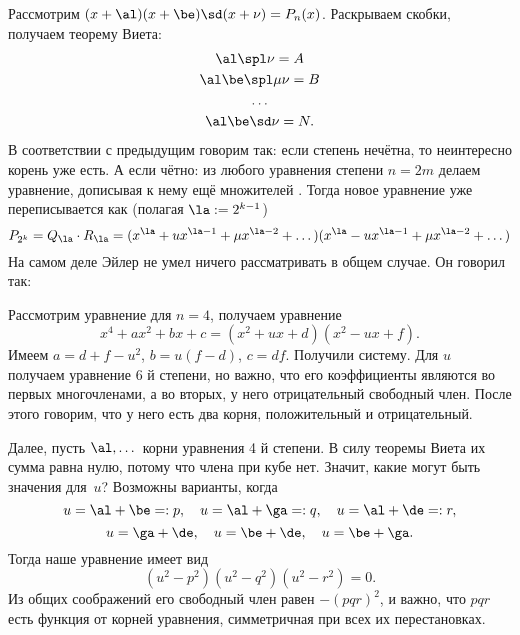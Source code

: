 \documentclass[a4paper,oneside,fleqn,10pt]{article}
\begin{document}
Рассмотрим $(x + \al)(x + \be)\sd(x+\nu) = P_n(x)$.
Раскрываем скобки, получаем теорему Виета:
\begin{gather*}
\al \spl \nu = A\\
\al\be \spl \mu\nu = B\\
\ldots\\
\al\be\sd\nu  = N.
\end{gather*}
В соответствии с предыдущим говорим так:
если степень нечётна, то неинтересно корень уже есть.
А если чётно: из любого уравнения степени $n = 2m$ делаем уравнение, дописывая
к нему ещё множителей . Тогда новое уравнение уже переписывается
как (полагая $\la := 2^{k-1}$)
$$
  P_{2^k} = Q_\la \cdot R_\la=
  (x^\la + u x^{\la-1} + \mu x^{\la-2} + \dots)(x^\la - u x^{\la-1} + \mu x^{\la-2}+\dots )
$$
На самом деле Эйлер не умел ничего рассматривать в общем случае. Он говорил так:

Рассмотрим уравнение для $n=4$, получаем уравнение
$$
  x^4 + ax^2 + bx + c = (x^2 + ux + d) (x^2 - ux + f).
$$
Имеем $a = d + f - u^2$, $b = u(f-d)$, $c = df$.
Получили систему. Для $u$ получаем уравнение 6 й степени, но важно, что его коэффициенты
являются во первых многочленами, а во вторых, у него отрицательный свободный член.
После этого говорим, что у него есть два корня, положительный и отрицательный.

\medskip
\vbox{\offinterlineskip
{}
\vskip3pt
\vskip3pt
}
\medskip

Далее, пусть $\al, \dots$ корни уравнения 4 й степени. В силу теоремы Виета их сумма равна нулю,
потому что члена при кубе нет. Значит, какие могут быть значения для~$u$?
Возможны варианты, когда
$$
u = \al + \be =:p,\quad
u = \al + \ga=:q,\quad
u = \al + \de=:r,
$$
$$
u = \ga + \de,\quad
u = \be + \de,\quad
u = \be + \ga.$$
Тогда наше уравнение
имеет вид
$$
  (u^2-p^2)(u^2-q^2)(u^2-r^2) = 0.
$$
Из общих соображений его свободный член равен $-(pqr)^2$, и важно, что
$pqr$ есть функция от корней уравнения, симметричная при всех их перестановках.
\end{document}
